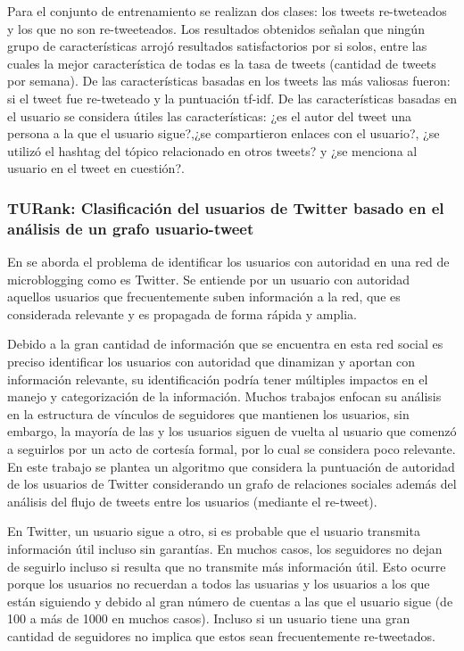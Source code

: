 Para el conjunto de entrenamiento se realizan dos clases: los tweets re-tweteados y los que no son re-tweeteados. Los resultados obtenidos señalan que ningún grupo de características arrojó resultados satisfactorios por si solos, entre las cuales la mejor característica de todas es la tasa de tweets (cantidad de tweets por semana). De las características basadas en los tweets las más valiosas fueron: si el tweet fue re-tweteado y la puntuación tf-idf. De las características basadas en  el usuario se considera útiles las características: ¿es el autor del tweet una persona a la que el usuario sigue?,¿se compartieron enlaces con el usuario?, ¿se utilizó el hashtag del tópico relacionado en otros tweets? y ¿se menciona al usuario en el tweet en cuestión?.

\subsubsection{TURank: Clasificación del usuarios de Twitter basado en el análisis de un grafo usuario-tweet}

 En \cite{Yamaguchi:2010:TTU:1991336.1991364} se aborda el problema de identificar los usuarios con autoridad en una red de microblogging como es Twitter. Se entiende por un usuario con autoridad aquellos usuarios que frecuentemente suben información a la red, que es considerada relevante y es propagada de forma rápida y amplia.
 
 Debido a la gran cantidad de información que se encuentra en esta red social es preciso identificar los usuarios con autoridad que dinamizan y aportan con información relevante, su identificación podría tener múltiples impactos en el manejo y categorización de la información. Muchos trabajos enfocan su análisis en la estructura de vínculos de seguidores que mantienen los usuarios, sin embargo, la mayoría de las y los usuarios siguen de vuelta al usuario que comenzó a seguirlos por un acto de cortesía formal, por lo cual se considera poco relevante. En este trabajo se plantea un algoritmo que considera la puntuación de autoridad de los usuarios de Twitter considerando un grafo de relaciones sociales además del análisis del flujo de tweets entre los usuarios (mediante el re-tweet).

En Twitter, un usuario sigue a otro, si es probable que el usuario transmita información útil incluso sin garantías. En muchos casos, los seguidores no dejan de seguirlo incluso si resulta que no transmite  más información útil. Esto ocurre porque los usuarios no recuerdan a todos las usuarias y los usuarios a los que están siguiendo y debido al gran número de cuentas a las que el usuario sigue (de 100 a más de 1000 en muchos casos). Incluso si un usuario tiene una gran cantidad de seguidores no implica que estos sean frecuentemente re-tweetados.


